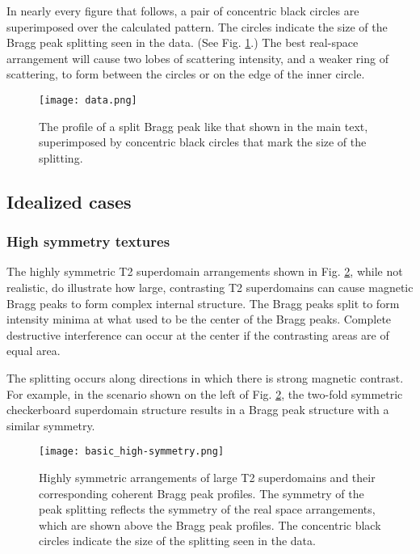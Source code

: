 \documentclass[aps, prb, reprint, showpacs, superscriptaddress]{revtex4-1}
\begin{document}
In nearly every figure that follows, a pair of concentric black circles are superimposed over the calculated pattern.
The circles indicate the size of the Bragg peak splitting seen in the data.
(See Fig. \ref{dataprofile}.)
The best real-space arrangement will cause two lobes of scattering intensity, and a weaker ring of scattering, to form between the circles or on the edge of the inner circle.
\begin{figure}[ht]
\begin{center}
\texttt{[image: data.png]}
\caption {
The profile of a split Bragg peak like that shown in the main text, superimposed by concentric black circles that mark the size of the splitting.
}  
\end{center}
\label{dataprofile}
\end{figure}

	\subsection{Idealized cases}

		\subsubsection{High symmetry textures}
		\setcounter{figure}{0}
		\renewcommand{\thefigure}{\thesection\arabic{figure}} 
The highly symmetric T2 superdomain arrangements shown in Fig. \ref{highsymmetry}, while not realistic, do illustrate how large, contrasting T2 superdomains can cause magnetic Bragg peaks to form complex internal structure.
The Bragg peaks split to form intensity minima at what used to be the center of the Bragg peaks.
Complete destructive interference can occur at the center if the contrasting areas are of equal area.

The splitting occurs along directions in which there is strong magnetic contrast.
For example, in the scenario shown on the left of Fig. \ref{highsymmetry}, the two-fold symmetric checkerboard superdomain structure results in a Bragg peak structure with a similar symmetry.
\begin{figure}[hbt]
\begin{center}
\texttt{[image: basic\_high-symmetry.png]}
\caption {
Highly symmetric arrangements of large T2 superdomains and their corresponding coherent Bragg peak profiles. 
The symmetry of the peak splitting reflects the symmetry of the real space arrangements, which are shown above the Bragg peak profiles. 
The concentric black circles indicate the size of the splitting seen in the data. 
}  \label{highsymmetry}
\end{center}
\end{figure}
\end{document}
